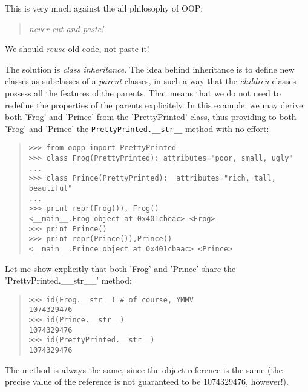 \documentclass[10pt,english]{article}
\begin{document}
This is very much against the all philosophy of OOP:
\begin{quote}

\emph{never cut and paste!}
\end{quote}

We should \emph{reuse} old code, not paste it!

The solution is \emph{class inheritance}. The idea behind inheritance is to 
define new classes as subclasses of a \emph{parent} classes, in such a way that 
the \emph{children} classes possess all the features of the parents. 
That means that we do not need to 
redefine the properties of the parents explicitely.
In this example, we may derive both 'Frog' and 'Prince' from
the 'PrettyPrinted' class, thus providing to both 'Frog' and  'Prince'
the \texttt{PrettyPrinted.{\_}{\_}str{\_}{\_}} method with no effort:
\begin{quote}
\begin{verbatim}>>> from oopp import PrettyPrinted
>>> class Frog(PrettyPrinted): attributes="poor, small, ugly"
...
>>> class Prince(PrettyPrinted):  attributes="rich, tall, beautiful"
...
>>> print repr(Frog()), Frog()
<__main__.Frog object at 0x401cbeac> <Frog>
>>> print Prince()
>>> print repr(Prince()),Prince()
<__main__.Prince object at 0x401cbaac> <Prince>\end{verbatim}
\end{quote}

Let me show explicitly that both 'Frog' and 'Prince' share the 
'PrettyPrinted.{\_}{\_}str{\_}{\_}' method:
\begin{quote}
\begin{verbatim}>>> id(Frog.__str__) # of course, YMMV
1074329476
>>> id(Prince.__str__)
1074329476
>>> id(PrettyPrinted.__str__)
1074329476\end{verbatim}
\end{quote}

The method is always the same, since the object reference is the same
(the precise value of the reference is not guaranteed to be  1074329476,
however!).
\end{document}
